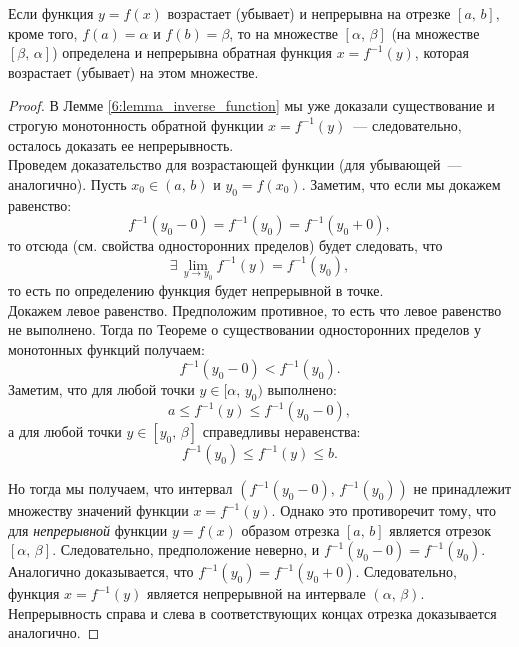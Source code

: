 \begin{theorem}
Если функция \(y = f(x)\) возрастает (убывает) и непрерывна на отрезке \([a, \, b]\),
кроме того, \(f(a) = \alpha\) и \(f(b) = \beta\), то на множестве \([\alpha, \, \beta]\)
(на множестве \([\beta, \, \alpha]\)) определена и непрерывна обратная функция \(x = f^{-1} (y)\),
которая возрастает (убывает) на этом множестве.

\begin{proof}
В Лемме \ref{6:lemma_inverse_function} мы уже доказали существование и строгую монотонность
обратной функции \(x = f^{-1} (y)\)~--- следовательно, осталось доказать ее непрерывность. \\

Проведем доказательство для возрастающей функции (для убывающей~--- аналогично).
Пусть \(x_{0} \in (a, \, b)\) и \(y_{0} = f(x_{0})\).
Заметим, что если мы докажем равенство:
\[
f^{-1} (y_{0} - 0) = f^{-1} (y_{0}) = f^{-1} (y_{0} + 0),
\]
то отсюда (см. свойства односторонних пределов) будет следовать, что
\[
\exists \, \lim_{ y \to y_{0} } f^{-1} (y) = f^{-1} (y_{0}),
\]
то есть по определению функция будет непрерывной в точке. \\

Докажем левое равенство.
Предположим противное, то есть что левое равенство не выполнено.
Тогда по Теореме о существовании односторонних пределов у монотонных функций получаем:
\[
f^{-1} (y_{0} - 0) < f^{-1} (y_{0}).
\]
Заметим, что для любой точки \(y \in [\alpha, \, y_{0})\) выполнено:
\[
a \leq f^{-1} (y) \leq f^{-1} (y_{0} - 0),
\]
а для любой точки \(y \in [y_{0}, \, \beta]\) справедливы неравенства:
\[
f^{-1} (y_{0}) \leq f^{-1} (y) \leq b.
\]

Но тогда мы получаем, что интервал \((f^{-1} (y_{0} - 0), \, f^{-1} (y_{0}))\)
не принадлежит множеству значений функции \(x = f^{-1} (y)\). Однако это противоречит тому,
что для \textit{непрерывной} функции \(y = f(x)\) образом отрезка \([a, \, b]\)
является отрезок \([\alpha, \, \beta]\). Следовательно, предположение неверно,
и \(f^{-1} (y_{0} - 0) = f^{-1} (y_{0}).\) \\

Аналогично доказывается, что \(f^{-1} (y_{0})  = f^{-1} (y_{0} + 0)\).
Следовательно, функция \(x = f^{-1} (y)\) является непрерывной на интервале \((\alpha, \, \beta)\).
Непрерывность справа и слева в соответствующих концах отрезка доказывается аналогично.
\end{proof}
\end{theorem}

